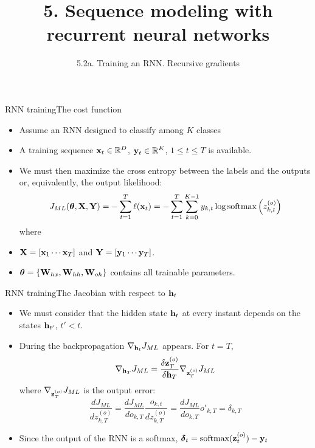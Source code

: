 \documentclass{beamer}
\title{5. Sequence modeling with recurrent neural networks}
\subtitle{5.2a. Training an RNN. Recursive gradients}
\begin{document}
\maketitle

\begin{frame}{RNN training}{The cost function}
\begin{itemize}
\item Assume an RNN designed to classify among $K$ classes \item A training sequence ${\bf x}_t \in \mathbb{R}^D$, ${\bf y}_t \in \mathbb{R}^K$, $1 \leq t \leq T$ is available.
\item We must then maximize the cross entropy between the labels and the outputs or, equivalently, the output likelihood: 
\begin{equation}\label{eq:RNN_cost}
    J_{ML}({\boldsymbol \theta},{\bf X},{\bf Y})=- \sum_{t=1}^T \ell({\bf x}_t) =-\sum_{t=1}^T\sum_{k=0}^{K-1} y_{k,t} \log \text{softmax}\left(z^{(o)}_{k,t}\right)
\end{equation}
 where
 \item ${\bf X} = \left[{\bf x}_1 \cdots {\bf x}_T \right]$ and ${\bf Y} =\left[{\bf y}_1 \cdots {\bf y}_T\right]$.
\item  ${\boldsymbol \theta} = \{{\bf W}_{hx}, {\bf W}_{hh}, {\bf W}_{oh}\}$ contains all trainable parameters. 
\end{itemize}
\end{frame}

\begin{frame}{RNN training}{The Jacobian with respect to ${\bf h}_t$}
\begin{itemize}
\item We  must consider that the hidden state ${\bf h}_t$ at every instant depends on the states ${\bf h}_{t'}$, $t'<t$. \item During the backpropagation  $\nabla_{{\bf h}_t}J_{ML}$ appears. For   $t=T$,
\begin{equation}\label{eq:grad_J_h_T}
    \nabla_{{\bf h}_T}J_{ML} = \frac{\delta {\bf z}^{(o)}_T}{\delta{\bf h}_T} \nabla_{{\bf z}^{(o)}_T}J_{ML}
\end{equation}
where $ \nabla_{{\bf z}^{(o)}_T}J_{ML}$ is the output error: 
\begin{equation}
    \frac{dJ_{ML}}{d z^{(o)}_{k,T}} = 
    \frac{dJ_{ML}}{d o_{k,T}} \frac{o_{k,t}}{d z^{(o)}_{k,T}}  =\frac{dJ_{ML}}{d o_{k,T}} o'_{k,T} =\delta_{k,T}
\end{equation}
 \item Since the output of the RNN is a softmax, ${\boldsymbol \delta}_{t} =  \text{softmax}({\bf z}^{(o)}_{t}) - {\bf y}_{t}$
\end{itemize}
\end{frame}
\end{document}
